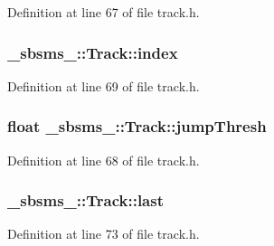 Definition at line 67 of file track.\+h.

\subsubsection[{\texorpdfstring{index}{index}}]{ \+\_\+sbsms\+\_\+\+::\+Track\+::index\hspace{0.3cm}{\ttfamily [protected]}}\hypertarget{class__sbsms___1_1_track_ac88f811c1500da75972b991e9a825035}{}\label{class__sbsms___1_1_track_ac88f811c1500da75972b991e9a825035}


Definition at line 69 of file track.\+h.

\subsubsection[{\texorpdfstring{jump\+Thresh}{jumpThresh}}]{\setlength{\rightskip}{0pt plus 5cm}float \+\_\+sbsms\+\_\+\+::\+Track\+::jump\+Thresh\hspace{0.3cm}{\ttfamily [protected]}}\hypertarget{class__sbsms___1_1_track_ae8c364ce671473ccef5a412d10a41a0f}{}\label{class__sbsms___1_1_track_ae8c364ce671473ccef5a412d10a41a0f}


Definition at line 68 of file track.\+h.

\subsubsection[{\texorpdfstring{last}{last}}]{ \+\_\+sbsms\+\_\+\+::\+Track\+::last\hspace{0.3cm}{\ttfamily [protected]}}\hypertarget{class__sbsms___1_1_track_a14fe4801125d8272d8fdc33bb612d539}{}\label{class__sbsms___1_1_track_a14fe4801125d8272d8fdc33bb612d539}


Definition at line 73 of file track.\+h.

